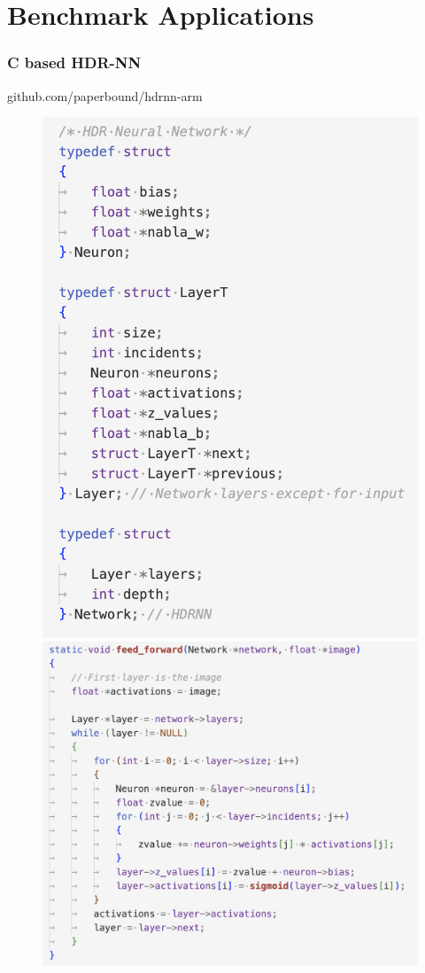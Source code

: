 \documentclass{beamer}
\begin{document}
\section{Benchmark Applications}

\begin{frame}
  \frametitle{C based HDR-NN}

  github.com/paperbound/hdrnn-arm

  \begin{figure}
    \centering
    \includegraphics[scale=0.32]{images/c-hdrnn.png}
    \includegraphics[scale=0.28]{images/c-ff.png}

\end{figure}
\end{frame}
\end{document}
